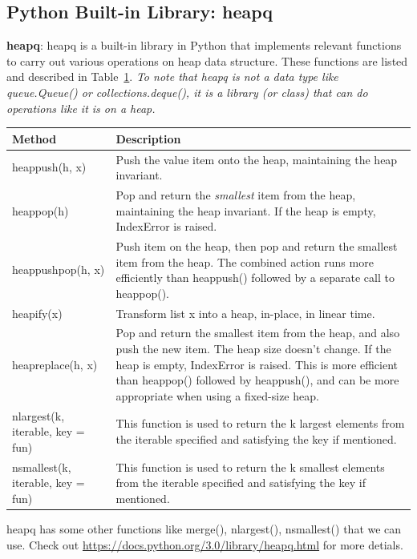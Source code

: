 \documentclass[main.tex]{subfiles}
\begin{document}
\subsection{Python Built-in Library: heapq}
\textbf{heapq}: heapq is a built-in library in Python that implements relevant functions to carry out various operations on heap data structure. These functions are listed and described in Table~\ref{tab:functions_in_heapq}. \textit{To note that heapq is not a data type like queue.Queue() or collections.deque(), it is a library (or class) that can do operations like it is on a heap.} %
\begin{table}[h]
\begin{small}
\centering
\noindent{}
 \noindent \begin{tabular}{|p{}|p{}| }
  \hline
Method & Description   \\ \hline
heappush(h, x)  &  Push the value item onto the heap, maintaining the heap invariant.  \\\hline
heappop(h)  &Pop and return the \textit{smallest} item from the heap, maintaining the heap invariant. If the heap is empty, IndexError is raised.\\ \hline
heappushpop(h, x)  &Push item on the heap, then pop and return the smallest item from the heap. The combined action runs more efficiently than heappush() followed by a separate call to heappop().\\ \hline
heapify(x) & Transform list x into a heap, in-place, in linear time.\\ \hline
heapreplace(h, x) & Pop and return the smallest item from the heap, and also push the new item. The heap size doesn’t change. If the heap is empty, IndexError is raised. This is more efficient than heappop() followed by heappush(), and can be more appropriate when using a fixed-size heap.\\ \hline
nlargest(k, iterable, key = fun) & This function is used to return the k largest elements from the iterable specified and satisfying the key if mentioned. \\ \hline
nsmallest(k, iterable, key = fun) & This function is used to return the k smallest elements from the iterable specified and satisfying the key if mentioned. \\ \hline
\end{tabular}
  \label{tab:functions_in_heapq}
  \end{small}
\end{table} 
heapq has some other functions like merge(), nlargest(), nsmallest() that we can use. Check out \url{https://docs.python.org/3.0/library/heapq.html} for more detials. 
\end{document}

